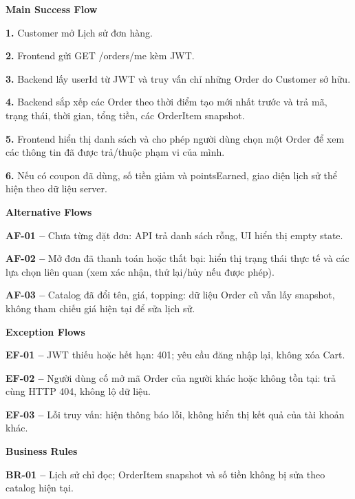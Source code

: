 \documentclass[11pt,a4paper,oneside]{report}
\begin{document}
\par\smallskip\noindent\textcolor{sgublue}{\textbf{Main Success Flow}}\par\nobreak
\textbf{1.} Customer mở Lịch sử đơn hàng.

\textbf{2.} Frontend gửi GET /orders/me kèm JWT.

\textbf{3.} Backend lấy userId từ JWT và truy vấn chỉ những Order do Customer sở hữu.

\textbf{4.} Backend sắp xếp các Order theo thời điểm tạo mới nhất trước và trả mã, trạng thái, thời gian, tổng tiền, các OrderItem snapshot.

\textbf{5.} Frontend hiển thị danh sách và cho phép người dùng chọn một Order để xem các thông tin đã được trả/thuộc phạm vi của mình.

\textbf{6.} Nếu có coupon đã dùng, số tiền giảm và pointsEarned, giao diện lịch sử thể hiện theo dữ liệu server.
\par

\par\smallskip\noindent\textcolor{sgublue}{\textbf{Alternative Flows}}\par\nobreak
\textbf{AF-01 --} Chưa từng đặt đơn: API trả danh sách rỗng, UI hiển thị empty state.

\textbf{AF-02 --} Mở đơn đã thanh toán hoặc thất bại: hiển thị trạng thái thực tế và các lựa chọn liên quan (xem xác nhận, thử lại/hủy nếu được phép).

\textbf{AF-03 --} Catalog đã đổi tên, giá, topping: dữ liệu Order cũ vẫn lấy snapshot, không tham chiếu giá hiện tại để sửa lịch sử.
\par

\par\smallskip\noindent\textcolor{sgublue}{\textbf{Exception Flows}}\par\nobreak
\textbf{EF-01 --} JWT thiếu hoặc hết hạn: 401; yêu cầu đăng nhập lại, không xóa Cart.

\textbf{EF-02 --} Người dùng cố mở mã Order của người khác hoặc không tồn tại: trả cùng HTTP 404, không lộ dữ liệu.

\textbf{EF-03 --} Lỗi truy vấn: hiện thông báo lỗi, không hiển thị kết quả của tài khoản khác.
\par

\par\smallskip\noindent\textcolor{sgublue}{\textbf{Business Rules}}\par\nobreak
\textbf{BR-01 --} Lịch sử chỉ đọc; OrderItem snapshot và số tiền không bị sửa theo catalog hiện tại.
\end{document}
